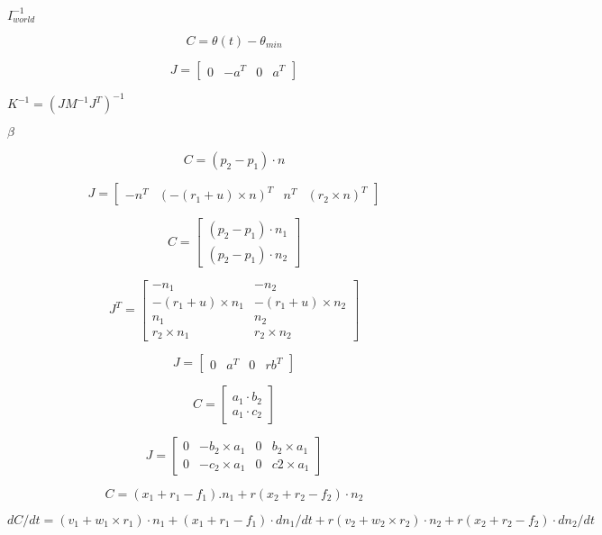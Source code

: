 \documentclass{article}
\begin{document}
$I_{world}^{-1}$
\pagebreak

\[C = \theta(t) - \theta_{min}\]
\pagebreak

\[J = \begin{bmatrix}0 & -a^T & 0 & a^T\end{bmatrix}\]
\pagebreak

$K^{-1} = \left( J M^{-1} J^T \right)^{-1}$
\pagebreak

$\beta$
\pagebreak

\[C = (p_2 - p_1) \cdot n\]
\pagebreak

\[J = \begin{bmatrix} -n^T & (-(r_1 + u) \times n)^T & n^T & (r_2 \times n)^T \end{bmatrix}\]
\pagebreak

\[C = \begin{bmatrix} (p_2 - p_1) \cdot n_1 \\ (p_2 - p_1) \cdot n_2\end{bmatrix}\]
\pagebreak

\[J^T = \begin{bmatrix}
-n_1                    & -n_2                  \\
-(r_1 + u) \times n_1   & -(r_1 + u) \times n_2 \\
n_1                     & n_2                   \\
r_2 \times n_1          & r_2 \times n_2
\end{bmatrix}\]
\pagebreak

\[J = \begin{bmatrix}0 & a^T & 0 & r b^T\end{bmatrix}\]
\pagebreak

\[C = \begin{bmatrix}a_1 \cdot b_2 \\ a_1 \cdot c_2\end{bmatrix}\]
\pagebreak

\[J = \begin{bmatrix}
0   & -b_2 \times a_1   & 0     & b_2 \times a_1    \\
0   & -c_2 \times a_1   & 0     & c2 \times a_1
\end{bmatrix}\]
\pagebreak

\[C = (x_1 + r_1 - f_1) . n_1 + r (x_2 + r_2 - f_2) \cdot n_2\]
\pagebreak

\[dC/dt = (v_1 + w_1 \times r_1) \cdot n_1 + (x_1 + r_1 - f_1) \cdot d n_1/dt + r (v_2 + w_2 \times r_2) \cdot n_2 + r (x_2 + r_2 - f_2) \cdot d n_2/dt\]
\pagebreak
\end{document}
